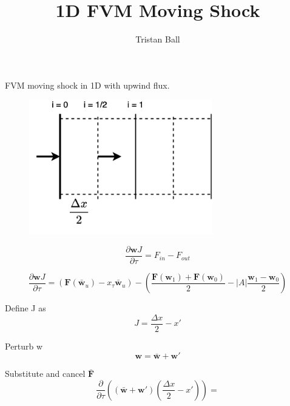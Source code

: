 \documentclass[10pt]{article}
\title{1D FVM Moving Shock}
\author{Tristan Ball}
\begin{document}
	
	FVM moving shock in 1D with upwind flux. 
	
	\begin{figure}[h]
		\includegraphics[width=8cm]{1D_FVM.png}
		\centering
	\end{figure}
	
	\begin{equation}
		\frac{\partial \mathbf{w} J}{\partial \tau} = F_{in} - F_{out}
	\end{equation}
	
	\begin{equation}
		\frac{\partial \mathbf{w} J}{\partial \tau} = (\mathbf{F}(\mathbf{\bar{w}}_u) - x_\tau \mathbf{\bar{w}}_u) - \left(\frac{\mathbf{F}(\mathbf{w}_1) + \mathbf{F}(\mathbf{w}_0)}{2} - |A|\frac{\mathbf{w}_1- \mathbf{w}_0}{2} \right)
	\end{equation}
	
	Define J as
	\begin{equation}
		J = \frac{\Delta x}{2} - x'
	\end{equation}
	
	Perturb w
	\begin{equation}
		\mathbf{w} = \bar{\mathbf{w}} + \mathbf{w}'
	\end{equation}
	
	Substitute and cancel $\bar{\mathbf{F}}$
	\begin{equation}
		\frac{\partial}{\partial \tau} \left( \left(\bar{\mathbf{w}} + \mathbf{w}'\right)\left(\frac{\Delta x}{2} - x'\right) \right) = 
	\end{equation}
	
	
\end{document}

